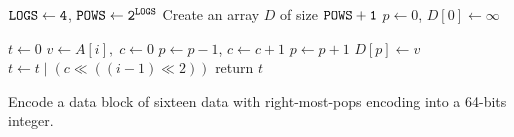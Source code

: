 \begin{algorithm}
\SetAlgoNoLine
{}

$\tt{LOGS} \gets 4$, $\tt{POWS} \gets 2^{\tt{LOGS}}$ \;
Create an array $D$ of size $\tt{POWS}+1$ \;
$p \gets 0$, $D[0] \gets \infty$ \;

$t \gets 0$ \;
 {
  $v \gets A[i], \; c \gets 0$\;
   {
    $p \gets p - 1$, $c \gets c + 1$ \;
  }
  $p \gets p + 1$ \;
  $D[p] \gets v$ \;
  $t \gets t \mathrel{|} (c \ll ((i-1) \ll 2))$ \;
}
return $t$ \;

  \caption{Encode a data block of sixteen data with right-most-pops
    encoding into a 64-bits integer.}
  \label{alg:cartesian-to-64bits}
\end{algorithm}
